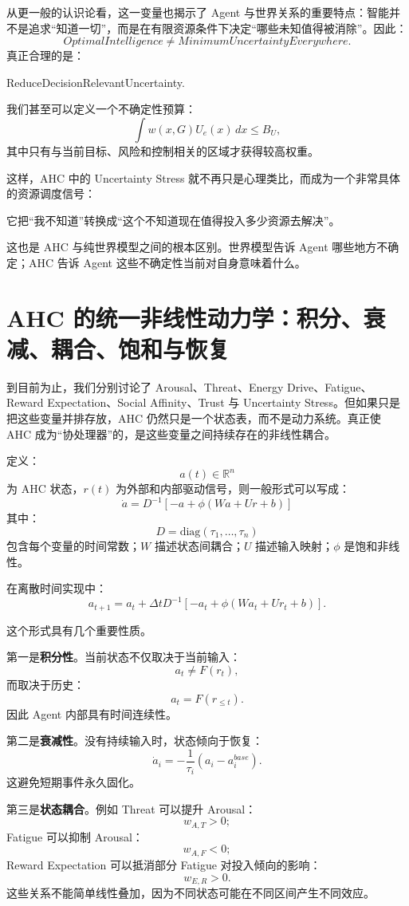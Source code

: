 从更一般的认识论看，这一变量也揭示了 Agent 与世界关系的重要特点：智能并不是追求“知道一切”，而是在有限资源条件下决定“哪些未知值得被消除”。因此：
\[
\boxed{
OptimalIntelligence
\neq
MinimumUncertaintyEverywhere.
}
\]
真正合理的是：
\begin{statementbox}
ReduceDecisionRelevantUncertainty.
\end{statementbox}

我们甚至可以定义一个不确定性预算：
\[
\int
w(x,G)U_e(x)\,dx
\leq
B_U,
\]
其中只有与当前目标、风险和控制相关的区域才获得较高权重。

这样，AHC 中的 Uncertainty Stress 就不再只是心理类比，而成为一个非常具体的资源调度信号：
\begin{statementbox}
它把“我不知道”转换成“这个不知道现在值得投入多少资源去解决”。
\end{statementbox}

这也是 AHC 与纯世界模型之间的根本区别。世界模型告诉 Agent 哪些地方不确定；AHC 告诉 Agent 这些不确定性当前对自身意味着什么。

\section{AHC 的统一非线性动力学：积分、衰减、耦合、饱和与恢复}

到目前为止，我们分别讨论了 Arousal、Threat、Energy Drive、Fatigue、Reward Expectation、Social Affinity、Trust 与 Uncertainty Stress。但如果只是把这些变量并排存放，AHC 仍然只是一个状态表，而不是动力系统。真正使 AHC 成为“协处理器”的，是这些变量之间持续存在的非线性耦合。

定义：
\[
a(t)\in\mathbb R^n
\]
为 AHC 状态，\(r(t)\) 为外部和内部驱动信号，则一般形式可以写成：
\[
\boxed{
\dot a
=
D^{-1}
\left[
-a
+
\phi
(
Wa
+
Ur
+
b
)
\right]
}
\]
其中：
\[
D
=
\mathrm{diag}
(\tau_1,\ldots,\tau_n)
\]
包含每个变量的时间常数；\(W\) 描述状态间耦合；\(U\) 描述输入映射；\(\phi\) 是饱和非线性。

在离散时间实现中：
\[
a_{t+1}
=
a_t
+
\Delta t
D^{-1}
\left[
-a_t
+
\phi(Wa_t+Ur_t+b)
\right].
\]

这个形式具有几个重要性质。

第一是\textbf{积分性}。当前状态不仅取决于当前输入：
\[
a_t\neq F(r_t),
\]
而取决于历史：
\[
a_t
=
F(r_{\leq t}).
\]
因此 Agent 内部具有时间连续性。

第二是\textbf{衰减性}。没有持续输入时，状态倾向于恢复：
\[
\dot a_i
=
-\frac{1}{\tau_i}
(a_i-a_i^{base}).
\]
这避免短期事件永久固化。

第三是\textbf{状态耦合}。例如 Threat 可以提升 Arousal：
\[
w_{A,T}>0;
\]
Fatigue 可以抑制 Arousal：
\[
w_{A,F}<0;
\]
Reward Expectation 可以抵消部分 Fatigue 对投入倾向的影响：
\[
w_{E,R}>0.
\]
这些关系不能简单线性叠加，因为不同状态可能在不同区间产生不同效应。

